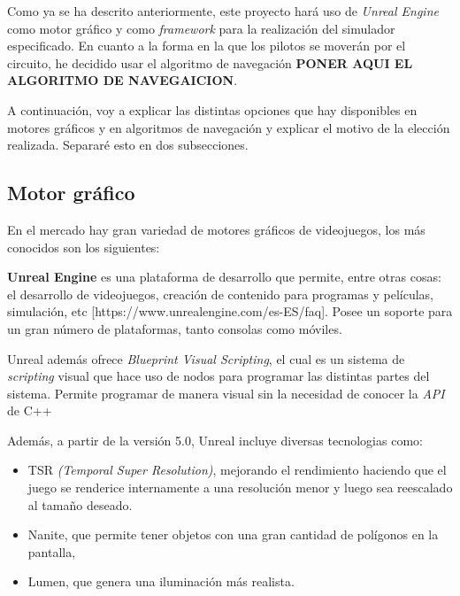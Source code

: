 \documentclass[a4paper,11pt]{book}
\begin{document}
Como ya se ha descrito anteriormente, este proyecto hará uso de \textit{Unreal Engine} como motor gráfico y como \textit{framework} para la realización del simulador especificado. En cuanto a la forma en la que los pilotos se moverán por el circuito, he decidido usar el algoritmo de navegación \textbf{PONER AQUI EL ALGORITMO DE NAVEGAICION}.

\bigskip

A continuación, voy a explicar las distintas opciones que hay disponibles en motores gráficos y en algoritmos de navegación y explicar el motivo de la elección realizada. Separaré esto en dos subsecciones.

\subsection{Motor gráfico}
En el mercado hay gran variedad de motores gráficos de videojuegos, los más conocidos son los siguientes:

\bigskip
\textbf{Unreal Engine} es una plataforma de desarrollo que permite, entre otras cosas: el desarrollo de videojuegos, creación de contenido para programas y películas, simulación, etc [https://www.unrealengine.com/es-ES/faq]. Posee un soporte para un gran número de plataformas, tanto consolas como móviles.

\bigskip

Unreal además ofrece \textit{Blueprint Visual Scripting}, el cual es un sistema de \textit{scripting} visual que hace uso de nodos para programar las distintas partes del sistema. Permite programar de manera visual sin la necesidad de conocer la \textit{API} de C++ %



\bigskip

Además, a partir de la versión 5.0, Unreal incluye diversas tecnologias como: 

\begin{itemize}
   \item TSR \textit{(Temporal Super Resolution)}, mejorando el rendimiento haciendo que el juego se renderice internamente a una resolución menor y luego sea reescalado al tamaño deseado.
   \item Nanite, que permite tener objetos con una gran cantidad de polígonos en la pantalla, 
   \item Lumen, que genera una iluminación más realista. %
\end{itemize}
\end{document}

